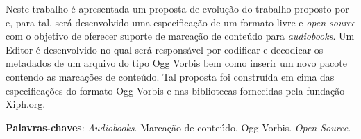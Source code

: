 \begin{resumo}

Neste trabalho é apresentada um proposta de evolução do trabalho proposto por \cite{herbert} e, para tal, será desenvolvido uma especificação de um formato livre e \textit{open source} com o objetivo de oferecer suporte de marcação de conteúdo para \textit{audiobooks}. Um Editor é desenvolvido no qual será responsável por codificar e decodicar os metadados de um arquivo do tipo Ogg Vorbis bem como inserir um novo pacote contendo as marcações de conteúdo. Tal proposta foi construída em cima das especificações do formato Ogg Vorbis e nas bibliotecas fornecidas pela fundação Xiph.org.

 \vspace{\onelineskip}
    
 \noindent
 \textbf{Palavras-chaves}: \textit{Audiobooks}. Marcação de conteúdo. Ogg Vorbis. \textit{Open Source}.
\end{resumo}
